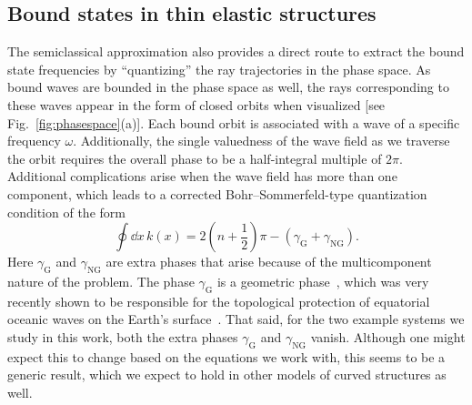 \subsection{Bound states in thin elastic structures}

The semiclassical approximation also provides a direct route to extract the bound state frequencies by ``quantizing'' the ray trajectories in the phase space.
As bound waves are bounded in the phase space as well, the rays corresponding to these waves appear in the form of closed orbits when visualized [see Fig.~\ref{fig:phasespace}(a)].
Each bound orbit is associated with a wave of a specific frequency $\omega$.
Additionally, the single valuedness of the wave field as we traverse the orbit requires the overall phase to be a half-integral multiple of $2\pi$.
Additional complications arise when the wave field has more than one component, which leads to a corrected Bohr--Sommerfeld-type quantization condition of the form
%
\begin{equation}
  \oint \dd{x}\,k(x) = 2\left(n + \frac{1}{2}\right)\pi - \left(\gamma_{\text{G}} + \gamma_{\text{NG}}\right).
\end{equation}
%
Here $\gamma_{\text{G}}$ and $\gamma_{\text{NG}}$ are extra phases that arise because of the multicomponent nature of the problem.
The phase $\gamma_{\text{G}}$ is a geometric phase~\cite{pancharatnam1956,berry1984}, which was very recently shown to be responsible for the topological protection of equatorial oceanic waves on the Earth's surface~\cite{venaille2023}.
That said, for the two example systems we study in this work, both the extra phases $\gamma_{\text{G}}$ and $\gamma_{\text{NG}}$ vanish.
Although one might expect this to change based on the equations we work with, this seems to be a generic result, which we expect to hold in other models of curved structures as well.

